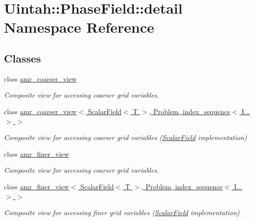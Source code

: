 \hypertarget{namespaceUintah_1_1PhaseField_1_1detail}{}\section{Uintah\+:\+:Phase\+Field\+:\+:detail Namespace Reference}
\label{namespaceUintah_1_1PhaseField_1_1detail}
\subsection*{Classes}
\begin{DoxyCompactItemize}
\item 
class \hyperlink{classUintah_1_1PhaseField_1_1detail_1_1amr__coarser__view}{amr\+\_\+coarser\+\_\+view}
\begin{DoxyCompactList}\small\item\em Composite view for accessing coarser grid variables. \end{DoxyCompactList}\item 
class \hyperlink{classUintah_1_1PhaseField_1_1detail_1_1amr__coarser__view_3_01ScalarField_3_01T_01_4_00_01Proble9cadea116dab5bdb44bb3e29abbe99ef}{amr\+\_\+coarser\+\_\+view$<$ Scalar\+Field$<$ T $>$, Problem, index\+\_\+sequence$<$ I... $>$ $>$}
\begin{DoxyCompactList}\small\item\em Composite view for accessing coarser grid variables (\hyperlink{structUintah_1_1PhaseField_1_1ScalarField}{Scalar\+Field} implementation) \end{DoxyCompactList}\item 
class \hyperlink{classUintah_1_1PhaseField_1_1detail_1_1amr__finer__view}{amr\+\_\+finer\+\_\+view}
\begin{DoxyCompactList}\small\item\em Composite view for accessing coarser grid variables. \end{DoxyCompactList}\item 
class \hyperlink{classUintah_1_1PhaseField_1_1detail_1_1amr__finer__view_3_01ScalarField_3_01T_01_4_00_01Problem_810ae3f886a4d3bdb2b37c629369a2ec}{amr\+\_\+finer\+\_\+view$<$ Scalar\+Field$<$ T $>$, Problem, index\+\_\+sequence$<$ I... $>$ $>$}
\begin{DoxyCompactList}\small\item\em Composite view for accessing finer grid variables (\hyperlink{structUintah_1_1PhaseField_1_1ScalarField}{Scalar\+Field} implementation) \end{DoxyCompactList}\item 

\end{DoxyCompactItemize}
